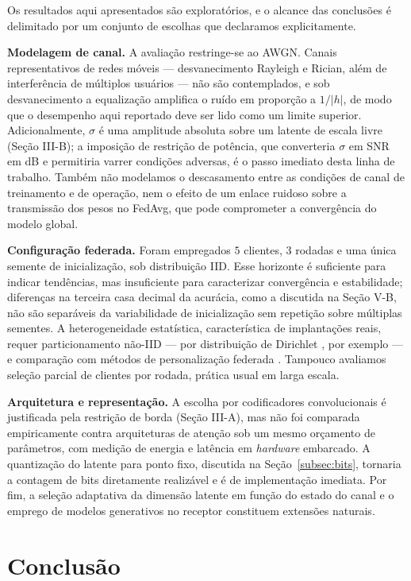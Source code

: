 \documentclass[conference]{IEEEtran}
\begin{document}
Os resultados aqui apresentados são exploratórios, e o alcance das conclusões é delimitado por um conjunto de escolhas que declaramos explicitamente.

\textbf{Modelagem de canal.} A avaliação restringe-se ao AWGN. Canais representativos de redes móveis --- desvanecimento Rayleigh e Rician, além de interferência de múltiplos usuários --- não são contemplados, e sob desvanecimento a equalização amplifica o ruído em proporção a $1/|h|$, de modo que o desempenho aqui reportado deve ser lido como um limite superior. Adicionalmente, $\sigma$ é uma amplitude absoluta sobre um latente de escala livre (Seção III-B); a imposição de restrição de potência, que converteria $\sigma$ em SNR em dB e permitiria varrer condições adversas, é o passo imediato desta linha de trabalho. Também não modelamos o descasamento entre as condições de canal de treinamento e de operação, nem o efeito de um enlace ruidoso sobre a transmissão dos pesos no FedAvg, que pode comprometer a convergência do modelo global.

\textbf{Configuração federada.} Foram empregados $5$ clientes, $3$ rodadas e uma única semente de inicialização, sob distribuição IID. Esse horizonte é suficiente para indicar tendências, mas insuficiente para caracterizar convergência e estabilidade; diferenças na terceira casa decimal da acurácia, como a discutida na Seção V-B, não são separáveis da variabilidade de inicialização sem repetição sobre múltiplas sementes. A heterogeneidade estatística, característica de implantações reais, requer particionamento não-IID --- por distribuição de Dirichlet \cite{hsu2019dirichlet}, por exemplo --- e comparação com métodos de personalização federada \cite{peng2024psfl, wang2024fedcl}. Tampouco avaliamos seleção parcial de clientes por rodada, prática usual em larga escala.

\textbf{Arquitetura e representação.} A escolha por codificadores convolucionais é justificada pela restrição de borda (Seção III-A), mas não foi comparada empiricamente contra arquiteturas de atenção sob um mesmo orçamento de parâmetros, com medição de energia e latência em \textit{hardware} embarcado. A quantização do latente para ponto fixo, discutida na Seção~\ref{subsec:bits}, tornaria a contagem de bits diretamente realizável e é de implementação imediata. Por fim, a seleção adaptativa da dimensão latente em função do estado do canal e o emprego de modelos generativos no receptor constituem extensões naturais.

\section{Conclusão}
\end{document}
